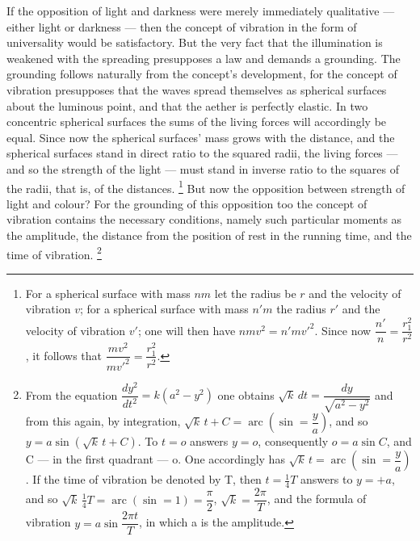 \documentclass[12pt,a4paper]{book}
\renewcommand{\thefootnote}{*)}
\begin{document}
If the opposition of light and darkness were merely immediately qualitative --- either light or darkness --- then the
concept of vibration in the form of universality would be satisfactory. But the very fact that the illumination is
weakened with the spreading presupposes a law and demands a grounding. The grounding follows naturally from the
concept's development, for the concept of vibration presupposes that the waves spread themselves as spherical surfaces
about the luminous point, and that the aether is perfectly elastic. In two concentric spherical surfaces the sums of the
living forces will accordingly be equal. Since now the spherical surfaces' mass grows with the distance, and the
spherical surfaces stand in direct ratio to the squared radii, the living forces --- and so the strength of the light
--- must stand in inverse ratio to the squares of the radii, that is, of the distances.%
\footnote{%
For a spherical surface with mass $nm$ let the radius be $r$ and the velocity of vibration $v$; for a spherical surface
with mass $n'm$ the radius $r'$ and the velocity of vibration $v'$; one will then have $nmv^{2} = n'mv'^{2}$. Since now
$\dfrac{n'}{n} = \dfrac{r_{1}^{2}}{r^{2}}$, it follows that
$\dfrac{mv^{2}}{mv'^{2}} = \dfrac{r_{1}^{2}}{r^{2}}$.}
But now the opposition between strength of light and colour? For the grounding of this opposition too the concept of
vibration contains the necessary conditions, namely such particular moments as the amplitude, the distance from the
position of rest in the running time, and the time of vibration.%
\renewcommand{\thefootnote}{**)}%
\footnote{%
From the equation $\dfrac{dy^{2}}{dt^{2}} = k(a^{2}-y^{2})$ one obtains
$\sqrt{k}\,dt = \dfrac{dy}{\sqrt{a^{2}-y^{2}}}$ and from this again, by integration,
$\sqrt{k}\,t + C = \operatorname{arc}\left(\sin = \dfrac{y}{a}\right)$, and so
$y = a\sin(\sqrt{k}\,t + C)$. To $t = o$ answers $y = o$,
consequently $o = a\sin C$, and C --- in the first quadrant --- o. One accordingly has
$\sqrt{k}\,t = \operatorname{arc}\left(\sin = \dfrac{y}{a}\right)$.
If the time of vibration be denoted by T, then $t = \tfrac{1}{4}T$ answers to $y = +a$, and so
$\sqrt{k}\,\tfrac{1}{4}T = \operatorname{arc}(\sin = 1) = \dfrac{\pi}{2}$,
$\sqrt{k} = \dfrac{2\pi}{T}$, and the formula of vibration
$y = a\sin\dfrac{2\pi t}{T}$, in which a is the amplitude.}%
\end{document}
